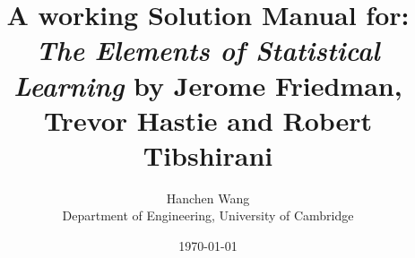 \documentclass[letterpaper,oneside]{book}
\numberwithin{exercisectr}{chapter}
\numberwithin{theorem}{chapter} %
\numberwithin{lemma}{chapter} %
\numberwithin{proposition}{chapter} %
\begin{document}
\doublespacing
\renewcommand{\labelenumi}{(\arabic{enumi})}

\title{
  { A working Solution Manual for: \textit{\textbf{The Elements of Statistical
  Learning}} by Jerome Friedman, Trevor Hastie and Robert Tibshirani}
}

\author{
  Hanchen Wang\\%
  Department of Engineering, University of Cambridge\\
}
\date{\today}
\maketitle

\onehalfspacing
{}
\tableofcontents

{}


\setcounter{chapter}{1}


\appendix
%


\end{document}
